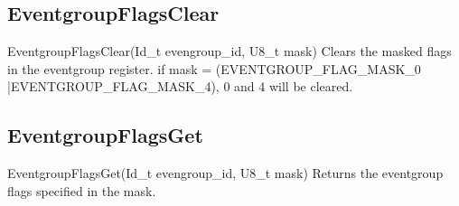 \subsection{EventgroupFlagsClear}
\label{func:EventgroupFlagsClear}
\begin{pdfunction}
{EventgroupFlagsClear(Id\_t evengroup\_id, U8\_t mask) }
{ 
Clears the masked flags in the eventgroup register. 
if mask = (EVENTGROUP\_FLAG\_MASK\_0 |EVENTGROUP\_FLAG\_MASK\_4), 
0 and 4 will be cleared. }
\end{pdfunction}

\subsection{EventgroupFlagsGet}
\label{func:EventgroupFlagsGet}
\begin{pdfunction}
{EventgroupFlagsGet(Id\_t evengroup\_id, U8\_t mask) }
{ 
Returns the eventgroup flags specified in the mask. }
\end{pdfunction}
